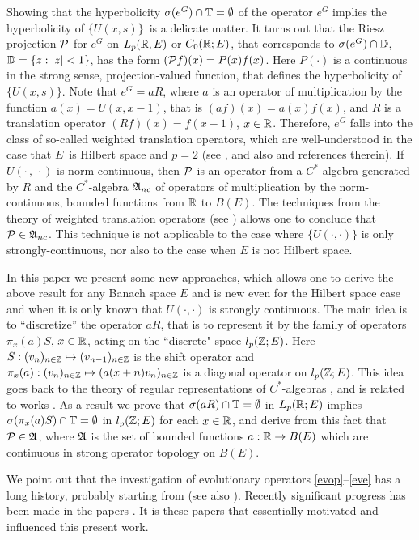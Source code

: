 Showing that the hyperbolicity
$\sigma (e^G) \cap{\Bbb{T}} =\emptyset$ of the operator $e^G$ implies
the hyperbolicity of $\{U(x,s)\}$\ is a delicate matter.
It turns out that the Riesz projection ${\cal{P}}$
for $e^G$
on $L_p({\Bbb{R}},E)$ or $C_0 ({\Bbb{R}};E)$,
that corresponds to $\sigma (e^G) \cap
{\Bbb{D}}$, ${\Bbb{D}}=\{z: |z|< 1 \}$,
has the form $({\cal{P}} f) (x) =P(x)f(x)$.  Here $P(\cdot)$ is a continuous
in the strong sense,
projection-valued function, that defines the hyperbolicity of $\{U(x,s)\}$.
Note that $e^G =aR$, where $a$ is an operator of multiplication by
the function $a(x) =U(x,x-1)$, that is $(af)(x)=a(x)f(x)$,
and $R$
is a translation operator
$(Rf)(x) =f(x-1)$, $x\in{\Bbb{R}}$.
Therefore, $e^G$ falls into the class of so-called
weighted translation operators, which are well-understood in the case that
$E$\ is
Hilbert space and $p=2$ (see \cite{1,2,18,27}, and
also \cite{8,23} and references therein). If
$U(\cdot\, , \, \cdot)$ is norm-continuous,
then ${\cal{P}}$ is an operator from
a $C^*$-algebra generated by $R$ and the $C^*$-algebra ${\frak{A}}_{nc}$
of operators of multiplication by the norm-continuous, bounded functions
from ${\Bbb{R}}$
to $B(E)$.  The techniques from the theory of weighted translation
operators (see \cite{1,2,18,27}) allows one to conclude
that ${\cal{P}}  \in {\frak{A}}_{nc}$.
This technique is not applicable to the case where $\{U(\cdot,\cdot)\}$
is only strongly-continuous, nor also to the case when $E$ is not
Hilbert space.

In this paper we
present some new approaches, which allows one to derive the above
result for any Banach space $E$ and
is new even for the Hilbert space case and
when it is only known that $U(\cdot , \cdot)$ is
strongly continuous.
The main idea is to
``discretize'' the operator $aR$, that is to represent it by the family of
operators $\pi_x (a) S$, $x\in{\Bbb{R}}$, acting on the
``discrete" space $l_p ({\Bbb{Z}};E)$.
Here $S: (v_n)_{n\in{\Bbb{Z}}} \mapsto (v_{n-1})_{n\in{\Bbb{Z}}}$ is the shift
operator and $\pi_x(a) :(v_n)_{n\in{\Bbb{Z}}}\mapsto (a(x+n)
v_n)_{n\in{\Bbb{Z}}}$ is a diagonal operator on $l_p ({\Bbb{Z}};E)$.
This idea goes back to the theory of
regular representations of $C^*$-algebras
\cite{26}, and is related to works
\cite{1,2,13,16,17,18}.
As a result we prove that
$\sigma (aR) \cap {\Bbb{T}} =\emptyset$ in $L_p({\Bbb{R}};E)$ implies $\sigma (\pi_x
(a) S)\cap {\Bbb{T}} =\emptyset$ in $l_p ({\Bbb{Z}}; E)$ for each $x\in{\Bbb{R}}$, and
derive from this fact that
${\cal{P}}\in {\frak{A}}$, where ${\frak{A}}$ is the set of
bounded functions  $a: {\Bbb{R}}\to B(E)$ which
are continuous in strong operator
topology on $B(E)$.

We point out that the investigation of evolutionary operators
\eqref{evop}--\eqref{eve} has a long history, probably starting from
\cite{14} (see also \cite{10,11,19,22}).
Recently significant progress has been made in the papers
\cite{3,4,25,27}.  It is these papers
that essentially motivated and
influenced this present work.

